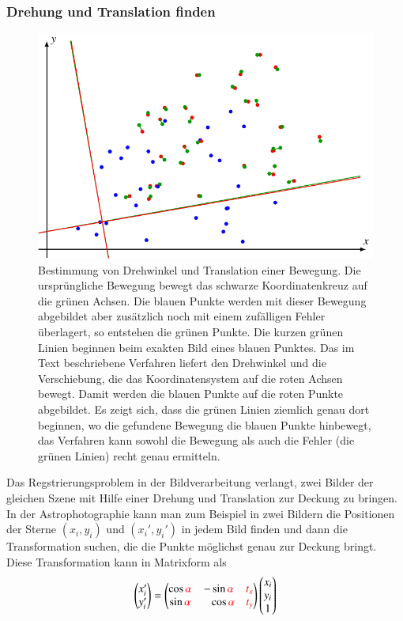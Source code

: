 \subsubsection{Drehung und Translation finden}
\begin{figure}
\centering
\includegraphics{4/images/bewegung.pdf}
\caption{Bestimmung von Drehwinkel und Translation einer Bewegung.
Die ursprüngliche Bewegung bewegt das schwarze Koordinatenkreuz auf
die grünen Achsen.
Die blauen Punkte werden mit dieser Bewegung abgebildet aber zusätzlich
noch mit einem zufälligen Fehler überlagert, so entstehen die grünen Punkte.
Die kurzen grünen Linien beginnen beim exakten Bild eines blauen Punktes.
Das im Text beschriebene Verfahren liefert den Drehwinkel und die
Verschiebung, die das Koordinatensystem auf die roten Achsen bewegt.
Damit werden die blauen Punkte auf die roten Punkte abgebildet.
Es zeigt sich, dass die grünen Linien ziemlich genau dort beginnen, wo
die gefundene Bewegung die blauen Punkte hinbewegt, das Verfahren kann
sowohl die Bewegung als auch die Fehler (die grünen Linien)
recht genau ermitteln.
\label{skript:bewegung-leastsquares}}
\end{figure}
Das Regstrierungsproblem in der Bildverarbeitung verlangt, zwei Bilder
der gleichen Szene mit Hilfe einer Drehung und Translation zur Deckung
zu bringen.
In der Astrophotographie kann man zum Beispiel in zwei Bildern die
Positionen der
Sterne $(x_i,y_i)$ und $(x_i',y_i')$ in jedem Bild finden und dann
die Transformation suchen, die die Punkte möglichst genau zur Deckung bringt.
Diese Transformation kann in Matrixform als
\begin{align*}
\begin{pmatrix}
x_i'\\y_i'
\end{pmatrix}
=
\begin{pmatrix}
\cos{\color{red}\alpha}&-\sin{\color{red}\alpha}& \color{red}t_x\\
\sin{\color{red}\alpha}&\phantom{-} \cos{\color{red}\alpha}& \color{red}t_y
\end{pmatrix}
\begin{pmatrix}
x_i\\y_i\\1
\end{pmatrix}
\end{align*}
